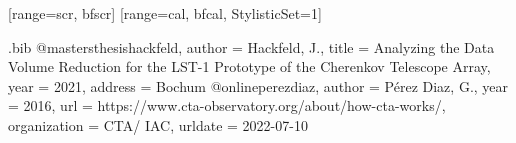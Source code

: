 
\DeclareSIUnit{}

\usetikzlibrary{overlay-beamer-styles,calc,tikzmark,decorations.pathreplacing}

[range={scr, bfscr}]
[range={cal, bfcal}, StylisticSet=1]

\begin{filecontents*}{\jobname.bib}
@mastersthesis{hackfeld,
  author      = {Hackfeld, J.},
  title       = {Analyzing the Data Volume Reduction for the LST-1 Prototype of the Cherenkov Telescope Array},
  year        = {2021},
  address     = {Bochum}
}
@online{perezdiaz,
  author       = {Pérez Diaz, G.},
  year         = {2016},
  url          = {https://www.cta-observatory.org/about/how-cta-works/},
  organization = {CTA/ IAC},
  urldate      = {2022-07-10}
}
\end{filecontents*}


\makeatletter
\def\@makefnmark{}
\makeatletter


\newcommand{\roundpic}[6][]{%
  \node [circle, draw, color=tugreen, minimum width = #2,
    path picture = {
      \node [#1] at (path picture bounding box.center) {
        \texttt{[image: \#4]}};
    }] at (#5,#6) {};}%

\renewcommand{\vec}[1]{\mathbf{#1}}


\newcommand{\yaml}[2]{%
  \texttt{\textcolor{#1}{\detokenize{#2}}}%
}